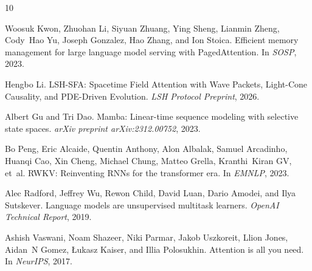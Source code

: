 \documentclass{article}
\begin{document}

\begin{thebibliography}{10}

Woosuk Kwon, Zhuohan Li, Siyuan Zhuang, Ying Sheng, Lianmin Zheng, Cody~Hao Yu, Joseph Gonzalez, Hao Zhang, and Ion Stoica.
\newblock Efficient memory management for large language model serving with PagedAttention.
\newblock In \emph{SOSP}, 2023.

Hengbo Li.
\newblock LSH-SFA: Spacetime Field Attention with Wave Packets, Light-Cone Causality, and PDE-Driven Evolution.
\newblock \emph{LSH Protocol Preprint}, 2026.

Albert Gu and Tri Dao.
\newblock Mamba: Linear-time sequence modeling with selective state spaces.
\newblock \emph{arXiv preprint arXiv:2312.00752}, 2023.

Bo Peng, Eric Alcaide, Quentin Anthony, Alon Albalak, Samuel Arcadinho, Huanqi Cao, Xin Cheng, Michael Chung, Matteo Grella, Kranthi~Kiran GV, et~al.
\newblock RWKV: Reinventing RNNs for the transformer era.
\newblock In \emph{EMNLP}, 2023.

Alec Radford, Jeffrey Wu, Rewon Child, David Luan, Dario Amodei, and Ilya Sutskever.
\newblock Language models are unsupervised multitask learners.
\newblock \emph{OpenAI Technical Report}, 2019.

Ashish Vaswani, Noam Shazeer, Niki Parmar, Jakob Uszkoreit, Llion Jones, Aidan~N Gomez, {\L}ukasz Kaiser, and Illia Polosukhin.
\newblock Attention is all you need.
\newblock In \emph{NeurIPS}, 2017.

\end{thebibliography}
\end{document}
